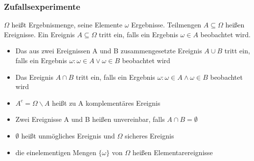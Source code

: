 \documentclass[
	ngerman,
	accentcolor=9c,%
	type=intern,
	marginpar=false
	]{tudapub}
\begin{document}
            \subsubsection{Zufallsexperimente}
                \begin{definition}
                    $\Omega$ heißt Ergebnismenge, seine Elemente $\omega$ Ergebnisse. Teilmengen $A \subseteq \Omega$ heißen Ereignisse.
                    Ein Ereignis $A \subseteq \Omega$ tritt ein, falls ein Ergebnis $\omega \in A$ beobachtet wird.
                \end{definition}
                \setcounter{satz}{2}
                \begin{definition}
                    \begin{itemize}
                        \item Das aus zwei Ereignissen A und B zusammengesetzte Ereignis $A\cup B$ tritt ein, falls ein Ergebnis
                        $\omega: \omega \in A \vee \omega \in B$ beobachtet wird
                        \item Das Ereignis $A \cap B$ tritt ein, falls ein Ergebnis
                        $\omega: \omega \in A \wedge \omega \in B$ beobachtet wird
                        \item $A^c = \Omega \backslash A$ heißt zu A komplementäres Ereignis
                        \item Zwei Ereignisse A und B heißen unvereinbar, falls $A\cap B = \emptyset$
                        \item $\emptyset$ heißt unmögliches Ereignis und $\Omega$ sicheres Ereignis
                        \item die einelementigen Mengen $\{\omega\}$ von $\Omega$ heißen Elementarereignisse
                    \end{itemize}
                \end{definition}
\end{document}
